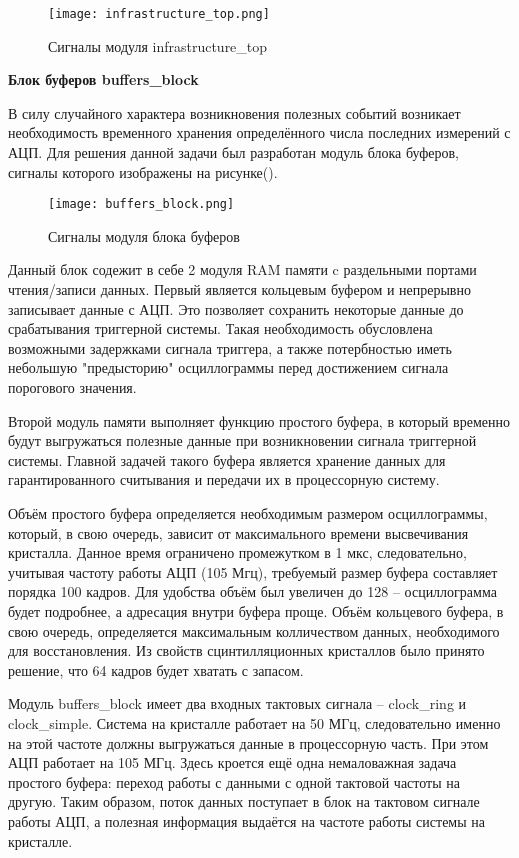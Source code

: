 \begin{figure}[ht]
    \centering
    \texttt{[image: infrastructure\_top.png]}
    \caption{Сигналы модуля infrastructure\_top}
    \label{fig:mpr}
\end{figure}
\textbf{Блок буферов buffers\_block}\par
В силу случайного характера возникновения полезных событий возникает необходимость временного хранения определённого числа последних измерений с АЦП. Для решения данной задачи был разработан модуль блока буферов, сигналы которого изображены на рисунке().\par
\begin{figure}[ht]
    \centering
    \texttt{[image: buffers\_block.png]}
    \caption{Сигналы модуля блока буферов}
    \label{fig:mpr}
\end{figure}
Данный блок содежит в себе 2 модуля RAM памяти c раздельными портами чтения/записи данных. Первый является кольцевым буфером и непрерывно записывает данные с АЦП. Это позволяет сохранить некоторые данные до срабатывания триггерной системы. Такая необходимость обусловлена возможными задержками сигнала триггера, а также потербностью иметь небольшую "предысторию" осциллограммы перед достижением сигнала порогового значения.\par
Второй модуль памяти выполняет функцию простого буфера, в который временно будут выгружаться полезные данные при возникновении сигнала триггерной системы. Главной задачей такого буфера является хранение данных для гарантированного считывания и передачи их в процессорную систему.\par
Объём простого буфера определяется необходимым размером осциллограммы, который, в свою очередь, зависит от максимального времени высвечивания кристалла. Данное время ограничено промежутком в 1 мкс, следовательно, учитывая частоту работы АЦП (105 Мгц), требуемый размер буфера составляет порядка 100 кадров. Для удобства объём был увеличен до 128 -- осциллограмма будет подробнее, а адресация внутри буфера проще. Объём кольцевого буфера, в свою очередь, определяется максимальным колличеством данных, необходимого для восстановления. Из свойств сцинтилляционных кристаллов было принято решение, что 64 кадров будет хватать с запасом.\par
Модуль buffers\_block имеет два входных тактовых сигнала -- clock\_ring и clock\_simple. Система на кристалле работает на 50 МГц, следовательно именно на этой частоте должны выгружаться данные в процессорную часть. При этом АЦП работает на 105 МГц. Здесь кроется ещё одна немаловажная задача простого буфера: переход работы с данными с одной тактовой частоты на другую. Таким образом, поток данных поступает в блок на тактовом сигнале работы АЦП, а полезная информация выдаётся на частоте работы системы на кристалле.\par
